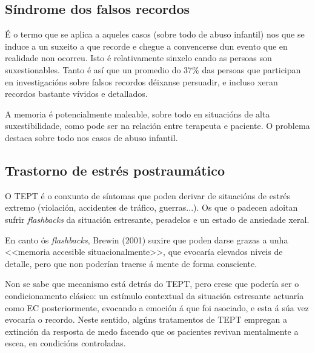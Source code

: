 \documentclass[a4paper,11pt]{article}
\begin{document}
\subsection{Síndrome dos falsos recordos}
É o termo que se aplica a aqueles casos (sobre todo de abuso infantil) nos que se induce a un suxeito a que recorde e chegue a convencerse dun evento que en realidade non ocorreu. Isto é relativamente sinxelo cando as persoas son suxestionables. Tanto é así que un promedio do 37\% das persoas que participan en investigacións sobre falsos recordos déixanse persuadir, e incluso xeran recordos bastante vívidos e detallados.

A memoria é potencialmente maleable, sobre todo en situacións de alta suxestibilidade, como pode ser na relación entre terapeuta e paciente. O problema destaca sobre todo nos casos de abuso infantil.

\subsection{Trastorno de estrés postraumático}
O TEPT é o conxunto de síntomas que poden derivar de situacións de estrés extremo (violación, accidentes de tráfico, guerras...). Os que o padecen adoitan sufrir \textit{flashbacks} da situación estresante, pesadelos e un estado de ansiedade xeral.

En canto ós \textit{flashbacks}, Brewin (2001) suxire que poden darse grazas a unha <<memoria accesible situacionalmente>>, que evocaría elevados niveis de detalle, pero que non poderían traerse á mente de forma consciente. 

Non se sabe que mecanismo está detrás do TEPT, pero crese que podería ser o condicionamento clásico: un estímulo contextual da situación estresante actuaría como EC posteriormente, evocando a emoción á que foi asociado, e esta á súa vez evocaría o recordo. Neste sentido, algúns tratamentos de TEPT empregan a extinción da resposta de medo facendo que os pacientes revivan mentalmente a escea, en condicións controladas. 
\end{document}
